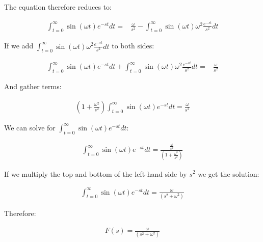 \documentclass[12pt, letterpaper]{../assignment}
\begin{document}
The equation therefore reduces to:

\begin{equation*}
    \begin{aligned}
    \int_{t=0}^{\infty} \sin(\omega t) e^{-st} dt =& \frac{\omega}{s^2} - \int_{t=0}^{\infty} \sin(\omega t) \omega^2 \frac{e^{-st}}{s^2} dt
\end{aligned}
\end{equation*}

If we add $\int_{t=0}^{\infty} \sin(\omega t) \omega^2 \frac{e^{-st}}{s^2} dt$ to both sides:

\begin{equation*}
    \begin{aligned}
    \int_{t=0}^{\infty} \sin(\omega t) e^{-st} dt + \int_{t=0}^{\infty} \sin(\omega t) \omega^2 \frac{e^{-st}}{s^2} dt =& \frac{\omega}{s^2}
\end{aligned}
\end{equation*}

And gather terms:

\begin{equation*}
    \begin{aligned}
    \left(1+\frac{\omega^2}{s^2}\right)\int_{t=0}^{\infty} \sin(\omega t) e^{-st} dt = \frac{\omega}{s^2}
\end{aligned}
\end{equation*}

We can solve for $\int_{t=0}^{\infty} \sin(\omega t) e^{-st} dt$:

\begin{equation*}
    \begin{aligned}
    \int_{t=0}^{\infty} \sin(\omega t) e^{-st} dt = \frac{ \frac{\omega}{s^2} }{\left(1+\frac{\omega^2}{s^2}\right)}
\end{aligned}
\end{equation*}

If we multiply the top and bottom of the left-hand side by $s^2$ we get the solution:

\begin{equation*}
    \begin{aligned}
    \int_{t=0}^{\infty} \sin(\omega t) e^{-st} dt = \frac{ \omega }{\left(s^2+\omega^2\right)}
\end{aligned}
\end{equation*}

Therefore:
\begin{answer}
    
\begin{equation*}
    \begin{aligned}
        F(s) = \frac{ \omega }{\left(s^2+\omega^2\right)}
\end{aligned}
\end{equation*}
\end{answer}
\end{document}
